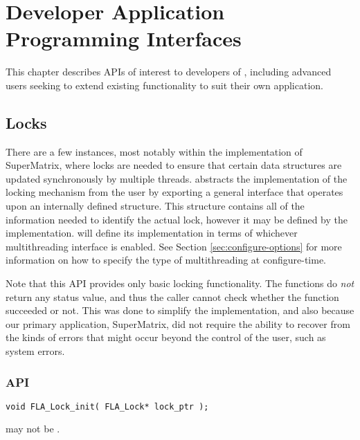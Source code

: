 \chapter{Developer Application Programming Interfaces}
\label{chapter:dev-apis}

This chapter describes APIs of interest to developers of \libflamens,
including advanced users seeking to extend existing functionality to suit
their own application.






\section{Locks}


There are a few instances, most notably within the \libflame implementation
of SuperMatrix, where locks are needed to ensure that certain data structures
are updated synchronously by multiple threads.
\libflame abstracts the implementation of the locking mechanism from the user
by exporting a general interface that operates upon an internally defined
\flalock structure.
This structure contains all of the information needed to identify the actual
lock, however it may be defined by the implementation.
\libflame will define its implementation in terms of whichever multithreading
interface is enabled.
See Section \ref{sec:configure-options} for more information on how to specify
the type of multithreading at configure-time.

Note that this API provides only basic locking functionality.
The functions do {\em not} return any status value, and thus the caller
cannot check whether the function succeeded or not.
This was done to simplify the implementation, and also because our primary
application, SuperMatrix, did not require the ability to recover from the
kinds of errors that might occur beyond the control of the user, such as
system errors.


\subsection{API}


\begin{flaspec}
\begin{verbatim}
void FLA_Lock_init( FLA_Lock* lock_ptr );
\end{verbatim}
\begin{checks}
\checkitem
\lockptr may not be \fnullns.
% 
\end{checks}
\begin{params}
\end{params}
\end{flaspec}

